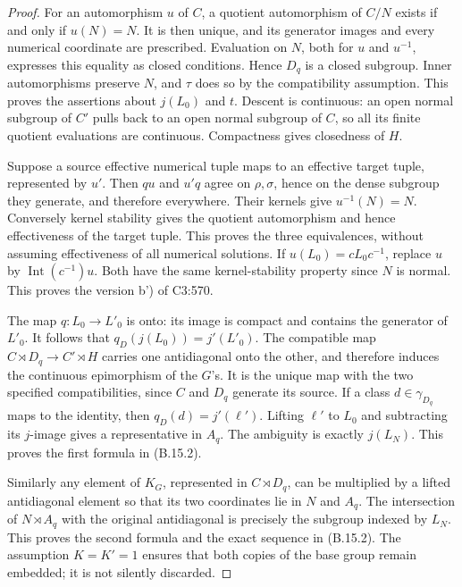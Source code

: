 \begin{proof}
For an automorphism \(u\) of \(C\), a quotient automorphism of
\(C/N\) exists if and only if \(u(N)=N\). It is then unique,
and its generator images and every numerical coordinate are
prescribed. Evaluation on \(N\), both for \(u\) and \(u^{-1}\),
expresses this equality as closed conditions. Hence \(D_q\) is a
closed subgroup. Inner automorphisms preserve \(N\), and \(\tau\)
does so by the compatibility assumption. This proves the assertions
about \(j(L_0)\) and \(t\). Descent is continuous: an open normal
subgroup of \(C'\) pulls back to an open normal subgroup of \(C\),
so all its finite quotient evaluations are continuous. Compactness
gives closedness of \(H\).

Suppose a source effective numerical tuple maps to an effective
target tuple, represented by \(u'\). Then \(qu\) and \(u'q\)
agree on \(\rho,\sigma\), hence on the dense subgroup they
generate, and therefore everywhere. Their kernels give
\(u^{-1}(N)=N\). Conversely kernel stability gives the quotient
automorphism and hence effectiveness of the target tuple. This
proves the three equivalences, without assuming effectiveness of
all numerical solutions. If \(u(L_0)=cL_0c^{-1}\), replace \(u\)
by \(\operatorname{Int}(c^{-1})u\). Both have the same
kernel-stability property since \(N\) is normal. This proves
the version b') of C3:570.

The map \(q:L_0\to L'_0\) is onto: its image is compact and
contains the generator of \(L'_0\). It follows that
\(q_D(j(L_0))=j'(L'_0)\). The compatible map
\(C\rtimes D_q\to C'\rtimes H\) carries one antidiagonal onto
the other, and therefore induces the continuous epimorphism of
the \(G\)'s. It is the unique map with the two specified
compatibilities, since \(C\) and \(D_q\) generate its source.
If a class \(d\in\gamma_{D_q}\) maps to the identity, then
\(q_D(d)=j'(\ell')\). Lifting \(\ell'\) to \(L_0\) and
subtracting its \(j\)-image gives a representative in \(A_q\).
The ambiguity is exactly \(j(L_N)\). This proves the first
formula in (B.15.2).

Similarly any element of \(K_G\), represented in
\(C\rtimes D_q\), can be multiplied by a lifted antidiagonal
element so that its two coordinates lie in \(N\) and \(A_q\).
The intersection of \(N\rtimes A_q\) with the original
antidiagonal is precisely the subgroup indexed by \(L_N\).
This proves the second formula and the exact sequence in
(B.15.2). The assumption \(K=K'=1\) ensures that both copies
of the base group remain embedded; it is not silently discarded.


\end{proof}
